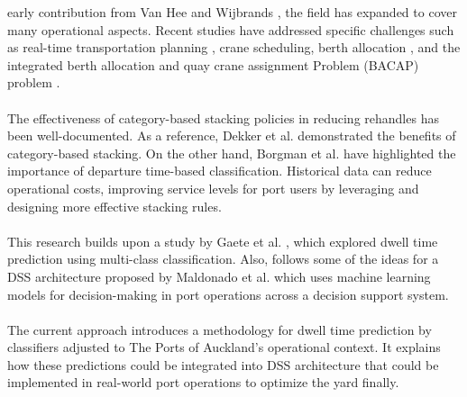 	early contribution from Van Hee and Wijbrands \cite{van1988decision}, the field has expanded to cover many
	operational aspects.
	Recent studies have addressed specific challenges such as real-time transportation planning
	\cite{bandeira2009dss, van2016real, shen1995dss}, crane scheduling, berth allocation
	\cite{wang2007stochastic}, and the integrated berth allocation and quay crane assignment Problem (BACAP) problem
	\cite{ursavas2014decision}.
	\\
	\\
	The effectiveness of category-based stacking policies in reducing rehandles has been well-documented. As a
	reference, Dekker et al. \cite{dekker2007advanced} demonstrated the benefits of category-based stacking. On the
	other hand, Borgman et al. \cite{borgman2010online} have highlighted the importance of departure time-based
	classification. Historical data can reduce operational costs, improving service levels for port users by
	leveraging and designing more effective stacking rules.
	\\
	\\
	This research builds upon a study by Gaete et al. \cite{gaete2018novel}, which explored dwell time prediction using
	multi-class classification. Also, follows some of the ideas for a DSS architecture proposed by Maldonado et al.
	\cite{maldonado2019analytics} which uses machine learning models for decision-making in port operations across a
	decision support system.
	\\
	\\
	The current approach introduces a methodology for dwell time prediction by classifiers adjusted to The Ports of
	Auckland's operational context. It explains how these predictions could be integrated into DSS architecture that
	could be implemented in real-world port operations to optimize the yard finally.


